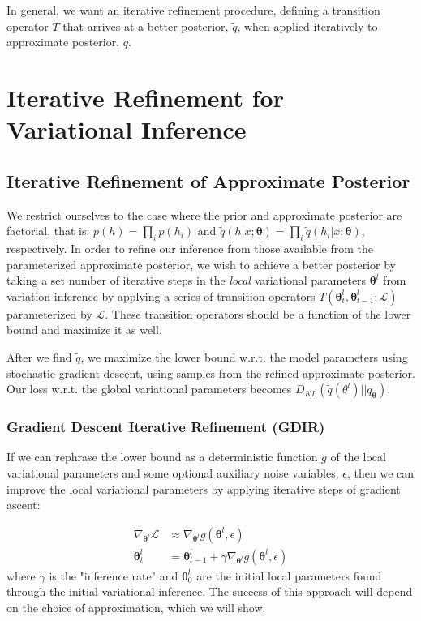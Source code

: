 \documentclass{article} %
\newcommand{\vects}[1]{\boldsymbol{#1}}
\newcommand{\TT}[0]{\vects{\theta}}
\newcommand{\grad}[0]{\nabla}
\newcommand{\LL}[0]{\mathcal{L}}
\begin{document}
In general, we want an iterative refinement procedure, defining a transition
operator $T$ that arrives at a better posterior, $\tilde{q}$, when applied
iteratively to approximate posterior, $q$. 

\section{Iterative Refinement for Variational Inference}

\subsection{Iterative Refinement of Approximate Posterior}
We restrict ourselves to the case where the prior and approximate posterior are
factorial, that is: $p(h) = \prod_i p(h_i)$ and $\tilde{q}(h|x; \TT) = \prod_i
\tilde{q}(h_i|x; \TT)$, respectively. In
order to refine our inference from those available from the parameterized
approximate posterior, we wish to achieve a better posterior by taking a set
number of iterative steps in the \emph{local} variational parameters $\TT^l$
from variation inference by applying a series of transition operators
$T(\TT^l_t, \TT^l_{t-1}; \LL)$ parameterized by $\LL$. These transition
operators should be a function of the lower bound and maximize it as well.

After we find $\tilde{q}$, we maximize the lower bound w.r.t. the model parameters using stochastic gradient descent, using samples from the refined approximate posterior. Our loss w.r.t. the global variational parameters becomes $D_{KL}(\tilde{q}(\theta^l)||q_{\TT})$.

\subsubsection{Gradient Descent Iterative Refinement (GDIR)}
If we can rephrase the lower bound as a deterministic function $g$ of the local
variational parameters and some optional auxiliary noise variables, $\epsilon$,
then we can improve the local variational parameters by applying iterative steps
of gradient ascent:

\begin{align}
\grad_{\TT^l} \LL &\approx \grad_{\TT^l} g(\TT^l, \epsilon) \nonumber \\
\TT^l_t &= \TT^l_{t-1} + \gamma \grad_{\TT^l} g(\TT^l, \epsilon)
\end{align}
where $\gamma$ is the "inference rate" and $\TT^l_0$ are the initial local
parameters found through the initial variational inference. The success of this
approach will depend on the choice of approximation, which we will show.
\end{document}
